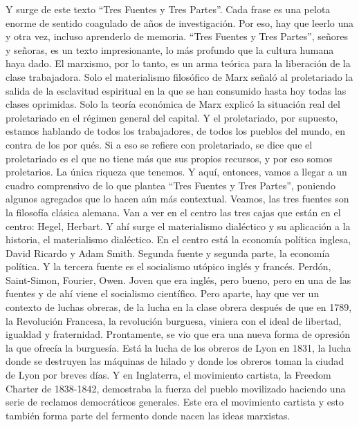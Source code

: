 \documentclass[
  jou,
  floatsintext,
  longtable,
  a4paper,
  nolmodern,
  notxfonts,
  notimes,
  12pt,
  colorlinks=true,linkcolor=blue,citecolor=blue,urlcolor=blue]{apa7}
\begin{document}
Y surge de este texto ``Tres Fuentes y Tres Partes''. Cada frase es una
pelota enorme de sentido coagulado de años de investigación. Por eso,
hay que leerlo una y otra vez, incluso aprenderlo de memoria. ``Tres
Fuentes y Tres Partes'', señores y señoras, es un texto impresionante,
lo más profundo que la cultura humana haya dado. El marxismo, por lo
tanto, es un arma teórica para la liberación de la clase trabajadora.
Solo el materialismo filosófico de Marx señaló al proletariado la salida
de la esclavitud espiritual en la que se han consumido hasta hoy todas
las clases oprimidas. Solo la teoría económica de Marx explicó la
situación real del proletariado en el régimen general del capital. Y el
proletariado, por supuesto, estamos hablando de todos los trabajadores,
de todos los pueblos del mundo, en contra de los por qués. Si a eso se
refiere con proletariado, se dice que el proletariado es el que no tiene
más que sus propios recursos, y por eso somos proletarios. La única
riqueza que tenemos. Y aquí, entonces, vamos a llegar a un cuadro
comprensivo de lo que plantea ``Tres Fuentes y Tres Partes'', poniendo
algunos agregados que lo hacen aún más contextual. Veamos, las tres
fuentes son la filosofía clásica alemana. Van a ver en el centro las
tres cajas que están en el centro: Hegel, Herbart. Y ahí surge el
materialismo dialéctico y su aplicación a la historia, el materialismo
dialéctico. En el centro está la economía política inglesa, David
Ricardo y Adam Smith. Segunda fuente y segunda parte, la economía
política. Y la tercera fuente es el socialismo utópico inglés y francés.
Perdón, Saint-Simon, Fourier, Owen. Joven que era inglés, pero bueno,
pero en una de las fuentes y de ahí viene el socialismo científico. Pero
aparte, hay que ver un contexto de luchas obreras, de la lucha en la
clase obrera después de que en 1789, la Revolución Francesa, la
revolución burguesa, viniera con el ideal de libertad, igualdad y
fraternidad. Prontamente, se vio que era una nueva forma de opresión la
que ofrecía la burguesía. Está la lucha de los obreros de Lyon en 1831,
la lucha donde se destruyen las máquinas de hilado y donde los obreros
toman la ciudad de Lyon por breves días. Y en Inglaterra, el movimiento
cartista, la Freedom Charter de 1838-1842, demostraba la fuerza del
pueblo movilizado haciendo una serie de reclamos democráticos generales.
Este era el movimiento cartista y esto también forma parte del fermento
donde nacen las ideas marxistas.
\end{document}
